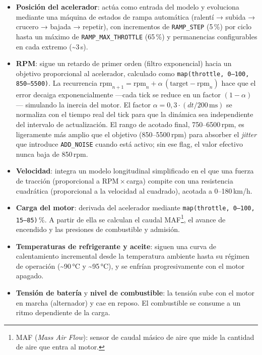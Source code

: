 \begin{itemize}
    \item \textbf{Posición del acelerador}: actúa como entrada del modelo y evoluciona mediante una máquina de estados de rampa automática (ralentí → subida → crucero → bajada → repetir), con incrementos de \texttt{RAMP\_STEP} (5\,\%) por ciclo hasta un máximo de \texttt{RAMP\_MAX\_THROTTLE} (65\,\%) y permanencias configurables en cada extremo (\textasciitilde{}3\,s).

    \item \textbf{RPM}: sigue un retardo de primer orden (filtro exponencial) hacia un objetivo proporcional al acelerador, calculado como \texttt{map(throttle, 0--100, 850--5500)}. La recurrencia $\text{rpm}_{n+1} = \text{rpm}_n + \alpha\,(\text{target} - \text{rpm}_n)$ hace que el error decaiga exponencialmente —cada tick se reduce en un factor $(1-\alpha)$— simulando la inercia del motor. El factor $\alpha = 0{,}3\cdot(dt/200\,\text{ms})$ se normaliza con el tiempo real del tick para que la dinámica sea independiente del intervalo de actualización. El rango de acotado final, 750--6500\,rpm, es ligeramente más amplio que el objetivo (850--5500\,rpm) para absorber el \textit{jitter} que introduce \texttt{ADD\_NOISE} cuando está activo; sin ese flag, el valor efectivo nunca baja de 850\,rpm.

    \item \textbf{Velocidad}: integra un modelo longitudinal simplificado en el que una fuerza de tracción (proporcional a RPM\,$\times$\,carga) compite con una resistencia cuadrática (proporcional a la velocidad al cuadrado), acotada a 0--180\,km/h.

    \item \textbf{Carga del motor}: derivada del acelerador mediante  \texttt{map(throttle, 0--100, 15--85)}\,\%. A partir de ella se calculan el caudal MAF\footnote{MAF (\textit{Mass Air Flow}): sensor de caudal másico de aire que mide la cantidad de aire que entra al motor.}, el avance de encendido y las presiones de combustible y admisión.

    \item \textbf{Temperaturas de refrigerante y aceite}: siguen una curva de calentamiento incremental desde la temperatura ambiente hasta su régimen de operación (\textasciitilde{}90\,°C y \textasciitilde{}95\,°C), y se enfrían progresivamente con el motor apagado.

    \item \textbf{Tensión de batería} y \textbf{nivel de combustible}: la tensión sube con el motor en marcha (alternador) y cae en reposo. El combustible se consume a un ritmo dependiente de la carga.
\end{itemize}

